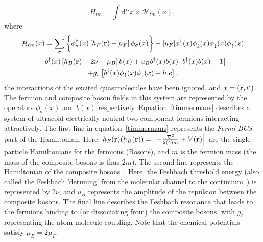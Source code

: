 \documentclass[aps,pra,floats,epsfig,pdflatex]{revtex4}                                                              %
\begin{document}
\begin{equation}
 H_{tm} = \int{{\mathrm d}^Dx} \times {\mathcal H_{tm}} (x),
\end{equation}
where
\begin{multline}
\label{timmermans}
{\mathcal H_{tm}}(x) =  \sum_{\sigma} \bigg\{ \phi^\dagger_\sigma(x) \left[h_F({\bf r})-\mu_F\right]\phi_\sigma(x) \bigg \} - |u_F| \phi^\dagger_\uparrow(x)\phi^\dagger_\downarrow(x)\phi^{}_\downarrow(x)\phi^{}_\uparrow(x)\\ 
+b^\dagger(x)\left[h_B({\bf r})+2\nu-\mu_B \right]b^{ }(x)+ u_B b^\dagger(x) b(x) \left[b^\dagger(x) b(x)-1\right]\\
+g_r\left[b^\dagger(x) \phi_\uparrow(x) \phi_\downarrow(x) + h.c\right],
\end{multline}
the interactions of the excited quasimolecules have been ignored, and $x=({\bf r},t')$. The fermion and composite boson fields in this system are represented by the operators  $\phi_\sigma(x)$ and $b(x)$  respectively. Equation~\ref{timmermans} describes a system of ultracold electrically neutral two-component fermions interacting attractively. The first line in equation~\ref{timmermans} represents the \textit{Fermi-BCS} part of the Hamiltonian. Here, $h_{F}({\bf r})(h_{B}({\bf r}))=\left[ - \frac{\nabla^2}{2(4)m}+V({\bf r}) \right]$ are the single particle Hamiltonians for the fermions (Bosons), and $m$ is the fermion mass (the mass of the composite bosons is thus $2m$). The second line represents the Hamiltonian of the composite bosons~\cite{timmermans, huang:becbcs2}. Here, the Feshbach threshold energy (also called the Feshbach 'detuning' from the molecular channel to the continuum~\cite{timmermans}) is represented by $2\nu$, and $u_B$ represents the amplitude of the repulsion between the composite 
bosons. The final line describes the Feshbach resonance that leads to the fermions binding to (or 
dissociating from) the composite bosons, with  $g_r$ representing the atom-molecule coupling. Note that the chemical potentials satisfy $\mu_B=2\mu_F$. 
\end{document}

